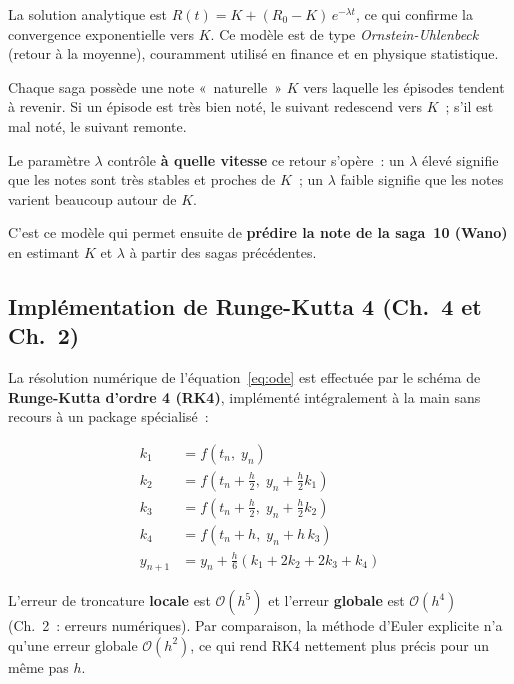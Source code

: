 \documentclass[a4paper,12pt,french]{article}
\begin{document}
La solution analytique est $R(t) = K + (R_0 - K)\,e^{-\lambda t}$, ce qui
confirme la convergence exponentielle vers $K$. Ce modèle est de type
\textit{Ornstein-Uhlenbeck} (retour à la moyenne), couramment utilisé en finance et en physique statistique.

\begin{tcolorbox}[justif, title={Autrement dit}]
Chaque saga possède une note «~naturelle~» $K$ vers laquelle les épisodes tendent à revenir. Si un épisode est très bien noté, le suivant redescend vers $K$~; s'il est mal noté, le suivant remonte.

Le paramètre $\lambda$ contrôle \textbf{à quelle vitesse} ce retour s'opère~:
un $\lambda$ élevé signifie que les notes sont très stables et proches de $K$~;
un $\lambda$ faible signifie que les notes varient beaucoup autour de $K$.

C'est ce modèle qui permet ensuite de \textbf{prédire la note de la saga~10
(Wano)} en estimant $K$ et $\lambda$ à partir des sagas précédentes.
\end{tcolorbox}
\newpage 
\subsection{Implémentation de Runge-Kutta 4 (Ch.~4 et Ch.~2)}

La résolution numérique de l'équation~\eqref{eq:ode} est effectuée par le schéma
de \textbf{Runge-Kutta d'ordre 4 (RK4)}, implémenté intégralement à la main sans
recours à un package spécialisé~:

\begin{equation}
  \begin{aligned}
    k_1 &= f(t_n,\; y_n) \\
    k_2 &= f\!\left(t_n + \tfrac{h}{2},\; y_n + \tfrac{h}{2}k_1\right) \\
    k_3 &= f\!\left(t_n + \tfrac{h}{2},\; y_n + \tfrac{h}{2}k_2\right) \\
    k_4 &= f(t_n + h,\; y_n + h\,k_3) \\
    y_{n+1} &= y_n + \frac{h}{6}(k_1 + 2k_2 + 2k_3 + k_4)
  \end{aligned}
  \label{eq:rk4}
\end{equation}

L'erreur de troncature \textbf{locale} est $\mathcal{O}(h^5)$ et l'erreur
\textbf{globale} est $\mathcal{O}(h^4)$ (Ch.~2~: erreurs numériques). Par
comparaison, la méthode d'Euler explicite n'a qu'une erreur globale
$\mathcal{O}(h^2)$, ce qui rend RK4 nettement plus précis pour un même pas $h$.
\end{document}
